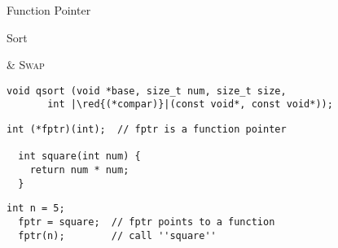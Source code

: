 \begin{frame}{}
  \centerline{\LARGE Function Pointer}

  \vspace{0.60cm}
\end{frame}

\begin{frame}{}
  \centerline{\Large Sort }

  \pause
  \vspace{0.30cm}
  \centerline{\large \textsc{} \& \textsc{Swap}}

\end{frame}

\begin{frame}[fragile]{}
  \centerline{\large {}}

  \vspace{0.30cm}
  \begin{lstlisting}[style = Cstyle]
  void qsort (void *base, size_t num, size_t size,
       int |\red{(*compar)}|(const void*, const void*));
  \end{lstlisting}

  \pause
  \vspace{0.30cm}
  \centerline{\large {}}
\end{frame}

\begin{frame}[fragile]{}
  \begin{lstlisting}[style = Cstyle]
  int (*fptr)(int);  // fptr is a function pointer

  int square(int num) {
    return num * num;
  }
  \end{lstlisting}

  \pause
  \vspace{0.30cm}
  \begin{lstlisting}[style = Cstyle]
  int n = 5;
  fptr = square;  // fptr points to a function
  fptr(n);        // call ''square''
  \end{lstlisting}

  \pause
  \vspace{0.30cm}
  \centerline{\large {}}
\end{frame}

